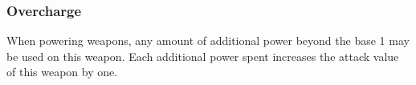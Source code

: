 \subsubsection{Overcharge}
When powering weapons, any amount of additional power beyond the base 1 may be used on this weapon. Each additional power spent increases the attack value of this weapon by one. 